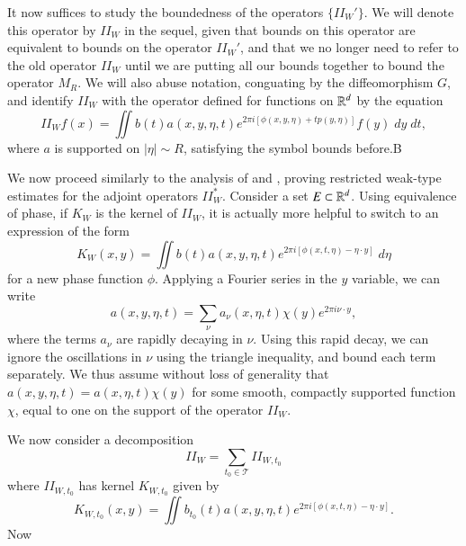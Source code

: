 It now suffices to study the boundedness of the operators $\{ II_W' \}$. We will denote this operator by $II_W$ in the sequel, given that bounds on this operator are equivalent to bounds on the operator $II_W'$, and that we no longer need to refer to the old operator $II_W$ until we are putting all our bounds together to bound the operator $M_R$. We will also abuse notation, conguating by the diffeomorphism $G$, and identify $II_W$ with the operator defined for functions on $\operatorname{\mathbb{R}}^d$ by the equation
%
\[ II_W f(x) = \iint b(t) a(x,y,\eta,t) e^{2 \pi i [\phi(x,y,\eta) + t p(y,\eta)]} f(y)\; dy\; dt, \]
%
where $a$ is supported on $|\eta| \sim R$, satisfying the symbol bounds before.B

We now proceed similarly to the analysis of \cite{HeoandNazarovandSeeger} and \cite{LeeSeeger}, proving restricted weak-type estimates for the adjoint operators $II_W^*$. Consider a set $E \subset \operatorname{\mathbb{R}}^d$. Using equivalence of phase, if $K_W$ is the kernel of $II_W$, it is actually more helpful to switch to an expression of the form
%
\[ K_W(x,y) = \iint b(t) a(x,y,\eta,t) e^{2 \pi i [\phi(x,t,\eta) - \eta \cdot y]}\; d\eta \]
%
for a new phase function $\phi$. Applying a Fourier series in the $y$ variable, we can write
%
\[ a(x,y,\eta,t) = \sum_\nu a_\nu(x,\eta,t) \chi(y) e^{2 \pi i \nu \cdot y}, \]
%
where the terms $a_\nu$ are rapidly decaying in $\nu$. Using this rapid decay, we can ignore the oscillations in $\nu$ using the triangle inequality, and bound each term separately. We thus assume without loss of generality that $a(x,y,\eta,t) = a(x,\eta,t) \chi(y)$ for some smooth, compactly supported function $\chi$, equal to one on the support of the operator $II_W$.

We now consider a decomposition
%
\[ II_W = \sum_{t_0 \in \mathcal{T}} II_{W,t_0} \]
%
where $II_{W,t_0}$ has kernel $K_{W,t_0}$ given by
%
\[ K_{W,t_0}(x,y) = \iint b_{t_0}(t) a(x,y,\eta,t) e^{2 \pi i [ \phi(x,t,\eta) - \eta \cdot y ]}. \]
%
Now



